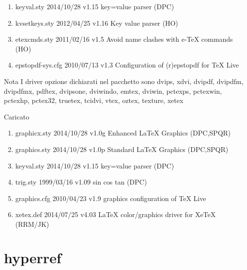 \begin{enumerate}
\item keyval.sty 2014/10/28 v1.15 key=value parser (DPC)
\item kvsetkeys.sty 2012/04/25 v1.16 Key value parser (HO)
\item etexcmds.sty 2011/02/16 v1.5 Avoid name clashes with e-TeX commands (HO)
\item epstopdf-sys.cfg 2010/07/13 v1.3 Configuration of (r)epstopdf for TeX Live 
\end{enumerate} 
Nota I driver opzione dichiarati nel pacchetto sono dvips, xdvi, dvipdf, dvipdfm, dvipdfmx, pdftex, dvipsone, dviwindo, emtex, dviwin, pctexps, pctexwin, pctexhp, pctex32, truetex, tcidvi, vtex, oztex, texture, xetex

Caricato 
\begin{enumerate}
 \item graphicx.sty 2014/10/28 v1.0g Enhanced LaTeX Graphics (DPC,SPQR)
 \item graphics.sty 2014/10/28 v1.0p Standard LaTeX Graphics (DPC,SPQR)
 \item keyval.sty 2014/10/28 v1.15 key=value parser (DPC)
 \item trig.sty 1999/03/16 v1.09 sin cos tan (DPC)
 \item graphics.cfg 2010/04/23 v1.9 graphics configuration of TeX Live
\item xetex.def 2014/07/25 v4.03 LaTeX color/graphics driver for XeTeX (RRM/JK)
\end{enumerate} 
\section{hyperref}  


